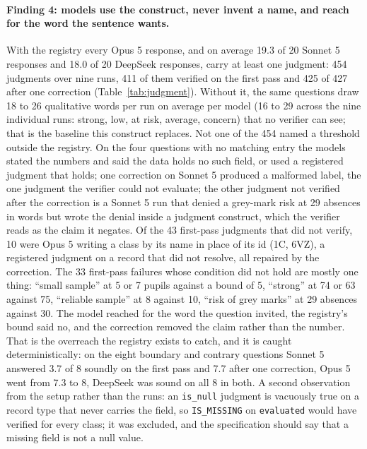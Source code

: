 \documentclass[11pt,a4paper]{article}
\begin{document}
\paragraph{Finding 4: models use the construct, never invent a name, and reach for the word the sentence wants.} With the registry every Opus 5 response, and on average 19.3 of 20 Sonnet 5 responses and 18.0 of 20 DeepSeek responses, carry at least one judgment: 454 judgments over nine runs, 411 of them verified on the first pass and 425 of 427 after one correction (Table~\ref{tab:judgment}). Without it, the same questions draw 18 to 26 qualitative words per run on average per model (16 to 29 across the nine individual runs: strong, low, at risk, average, concern) that no verifier can see; that is the baseline this construct replaces. Not one of the 454 named a threshold outside the registry. On the four questions with no matching entry the models stated the numbers and said the data holds no such field, or used a registered judgment that holds; one correction on Sonnet 5 produced a malformed label, the one judgment the verifier could not evaluate; the other judgment not verified after the correction is a Sonnet 5 run that denied a grey-mark risk at 29 absences in words but wrote the denial inside a judgment construct, which the verifier reads as the claim it negates. Of the 43 first-pass judgments that did not verify, 10 were Opus 5 writing a class by its name in place of its id (1C, 6VZ), a registered judgment on a record that did not resolve, all repaired by the correction. The 33 first-pass failures whose condition did not hold are mostly one thing: ``small sample'' at 5 or 7 pupils against a bound of 5, ``strong'' at 74 or 63 against 75, ``reliable sample'' at 8 against 10, ``risk of grey marks'' at 29 absences against 30. The model reached for the word the question invited, the registry's bound said no, and the correction removed the claim rather than the number. That is the overreach the registry exists to catch, and it is caught deterministically: on the eight boundary and contrary questions Sonnet 5 answered 3.7 of 8 soundly on the first pass and 7.7 after one correction, Opus 5 went from 7.3 to 8, DeepSeek was sound on all 8 in both. A second observation from the setup rather than the runs: an \texttt{is\_null} judgment is vacuously true on a record type that never carries the field, so \texttt{IS\_MISSING} on \texttt{evaluated} would have verified for every class; it was excluded, and the specification should say that a missing field is not a null value.
\end{document}
